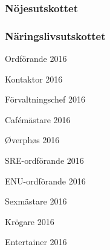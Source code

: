 \documentclass[../_main/handlingar.tex]{subfiles}
\begin{document}
\subsubsection*{Nöjesutskottet}

\subsubsection*{Näringslivsutskottet}
\newpage
\begin{signatures}{10}
    \mvh
    \signature{Fredrik Peterson}{Ordförande 2016}
    \signature{Erik Månsson}{Kontaktor 2016}
    \signature{Anders Nilsson}{Förvaltningschef 2016}
    \signature{Stephanie Mirsky}{Cafémästare 2016}
    \signature{Molly Rusk}{Øverphøs 2016}
    \signature{Johan Persson}{SRE-ordförande 2016}
    \signature{Johannes Koch}{ENU-ordförande 2016}
    \signature{Martin Gemborn Nilsson}{Sexmästare 2016}
    \signature{Malin Lindström}{Krögare 2016}
    \signature{Dalia Khairallah}{Entertainer 2016}
\end{signatures}
\end{document}
